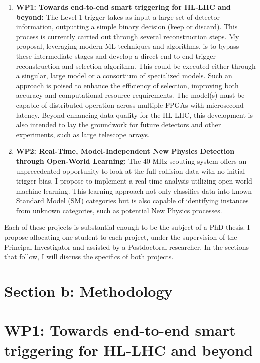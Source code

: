\documentclass[12pt]{iopart}
\begin{document}
\begin{enumerate}
    \item \textbf{WP1: Towards end-to-end smart triggering for HL-LHC and beyond:} The Level-1 trigger takes as input a large set of detector information, outputting a simple binary decision (keep or discard). This process is currently carried out through several reconstruction steps. My proposal, leveraging modern ML techniques and algorithms, is to bypass these intermediate stages and develop a direct end-to-end trigger reconstruction and selection algorithm. This could be executed either through a singular, large model or a consortium of specialized models. Such an approach is poised to enhance the efficiency of selection, improving both accuracy and computational resource requirements. The model(s) must be capable of distributed operation across multiple FPGAs with microsecond latency. Beyond enhancing data quality for the HL-LHC, this development is also intended to lay the groundwork for future detectors and other experiments, such as large telescope arrays.
\item \textbf{WP2: Real-Time, Model-Independent New Physics Detection through Open-World Learning:} The 40 MHz scouting system offers an unprecedented opportunity to look at the full collision data with no initial trigger bias. I propose to implement a real-time analysis utilizing open-world machine learning. This learning approach not only classifies data into known Standard Model (SM) categories but is also capable of identifying instances from unknown categories, such as potential New Physics processes.
\end{enumerate}

\noindent Each of these projects is substantial enough to be the subject of a PhD thesis. I propose allocating one student to each project, under the supervision of the Principal Investigator and assisted by a Postdoctoral researcher. In the sections that follow, I will discuss the specifics of both projects.


\section{Section b: Methodology}


\section{WP1: Towards end-to-end smart triggering for HL-LHC and beyond}
\end{document}
